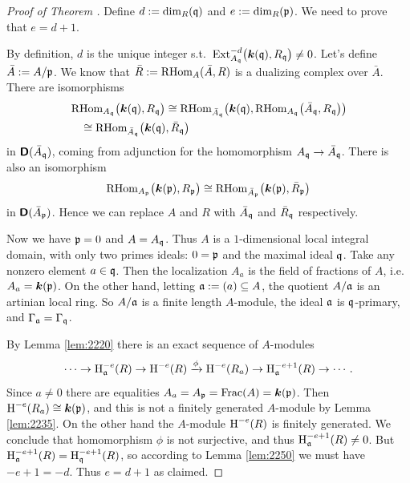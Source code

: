 \begin{proof}[Proof of Theorem \tup{\ref{thm:2205}}]
Define $d := \operatorname{dim}_R(\mathfrak{q})$ and $e := \operatorname{dim}_R(\mathfrak{p})$.
We need to prove that $e = d + 1$. 

By definition, $d$ is the unique integer s.t.\ 
$\operatorname{Ext}^{-d}_{A_{\mathfrak{q}}} \bigl( \boldsymbol{k}(\mathfrak{q}), R_{\mathfrak{q}} \bigr) \neq 0$.
Let's define $\bar{A} := A / \mathfrak{p}$. 
We know that 
$\bar{R} := \operatorname{RHom}_{A}(\bar{A}, R)$
is a dualizing complex over $\bar{A}$. There are isomorphisms 
\[ \begin{aligned}
& \operatorname{RHom}_{A_{\mathfrak{q}}} \bigl( \boldsymbol{k}(\mathfrak{q}), R_{\mathfrak{q}} \bigr) \cong 
\operatorname{RHom}_{\bar{A}_{\mathfrak{q}}} \bigl( \boldsymbol{k}(\mathfrak{q}), 
\operatorname{RHom}_{A_{\mathfrak{q}}} \bigl( \bar{A}_{\mathfrak{q}} , R_{\mathfrak{q}} \bigr) \bigr)
\\
& \quad 
\cong \operatorname{RHom}_{\bar{A}_{\mathfrak{q}}} \bigl( \boldsymbol{k}(\mathfrak{q}), \bar{R}_{\mathfrak{q}} \bigr)
\end{aligned} \]
in $\boldsymbol{\mathsf{D}}(\bar{A}_{\mathfrak{q}})$, coming from adjunction for the homomorphism 
$A_{\mathfrak{q}} \to \bar{A}_{\mathfrak{q}}$. 
There is also an isomorphism 
\[ \operatorname{RHom}_{A_{\mathfrak{p}}} \bigl( \boldsymbol{k}(\mathfrak{p}), R_{\mathfrak{p}} \bigr)  
\cong \operatorname{RHom}_{\bar{A}_{\mathfrak{p}}} \bigl( \boldsymbol{k}(\mathfrak{p}), \bar{R}_{\mathfrak{p}} \bigr) \]
in $\boldsymbol{\mathsf{D}}(\bar{A}_{\mathfrak{p}})$.
Hence we can replace $A$ and $R$ with $\bar{A}_{\mathfrak{q}}$ and $\bar{R}_{\mathfrak{q}}$ 
respectively. 

Now we have $\mathfrak{p} = 0$ and $A = A_{\mathfrak{q}}$. Thus $A$ is a $1$-dimensional local 
integral domain, 
with only two primes ideals: $0 = \mathfrak{p}$ and the maximal ideal $\mathfrak{q}$. Take 
any nonzero element $a \in \mathfrak{q}$. Then the localization $A_a$ is the field of 
fractions of $A$, i.e.\ $A_a = \boldsymbol{k}(\mathfrak{p})$. 
On the other hand, letting $\mathfrak{a} := (a) \subseteq A$, the quotient 
$A / \mathfrak{a}$ is an artinian local ring. So $A / \mathfrak{a}$ is a finite length 
$A$-module, the ideal $\mathfrak{a}$ is $\mathfrak{q}$-primary, and $\Gamma_{\mathfrak{a}} = \Gamma_{\mathfrak{q}}$. 
 
By Lemma \ref{lem:2220} there is an exact sequence of $A$-modules 
\[ \cdots \to \operatorname{H}^{-e}_{\mathfrak{a}}(R) \to \operatorname{H}^{-e}(R) \xrightarrow{\phi} 
\operatorname{H}^{-e}(R_a) \to \operatorname{H}^{-e + 1}_{\mathfrak{a}}(R) \to  \cdots . \]
Since $a \neq 0$ there are equalities $A_a = A_{\mathfrak{p}} = \operatorname{Frac}(A) = \boldsymbol{k}(\mathfrak{p})$. 
Then 
$\operatorname{H}^{-e}(R_a) \cong \boldsymbol{k}(\mathfrak{p})$, and this is not a finitely generated 
$A$-module by Lemma \ref{lem:2235}. On the other hand the $A$-module 
$\operatorname{H}^{-e}(R)$ is finitely generated. 
We conclude that homomorphism $\phi$ is not surjective, and thus 
$\operatorname{H}^{-e + 1}_{\mathfrak{a}}(R) \neq 0$. 
But 
$\operatorname{H}^{-e + 1}_{\mathfrak{a}}(R) = \operatorname{H}^{-e + 1}_{\mathfrak{q}}(R)$,
so according to Lemma \ref{lem:2250} we must have 
$-e + 1 = -d$. Thus $e = d + 1$ as claimed. 
\end{proof}

